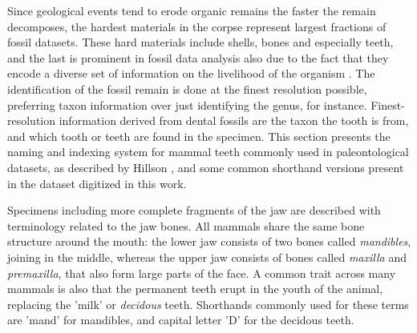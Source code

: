 \documentclass{article}
\begin{document}
Since geological events tend to erode organic remains the faster the remain decomposes, the hardest materials in 
the corpse represent largest fractions of fossil datasets. These hard materials include shells, bones and especially teeth, and 
the last is prominent in fossil data analysis also due to the fact that they encode a diverse set of information on 
the livelihood of the organism \cite{Faith_Lyman_2019}. The identification of the fossil remain is done at the finest resolution possible,
preferring taxon information over just identifying the genus, for instance. Finest-resolution information 
derived from dental fossils are the taxon the tooth is from, and which tooth or teeth are found in the specimen.
This section presents the naming and indexing system for mammal teeth commonly used in paleontological datasets,
as described by Hillson \cite{Hillson_2005}, and some common shorthand versions present in the dataset digitized in this work.

Specimens including more complete fragments of the jaw are described with terminology related 
to the jaw bones. All mammals share the same bone structure around the mouth: the lower jaw consists 
of two bones called \textit{mandibles}, joining in the middle, whereas the upper jaw consists of bones called 
\textit{maxilla} and \textit{premaxilla}, that also form large parts of the face.
A common trait across many mammals is also that the permanent teeth erupt in the 
youth of the animal, replacing the 'milk' or \textit{decidous} teeth. Shorthands commonly used for these 
terms are 'mand' for mandibles, and capital letter 'D' for the decidous teeth.
\end{document}
